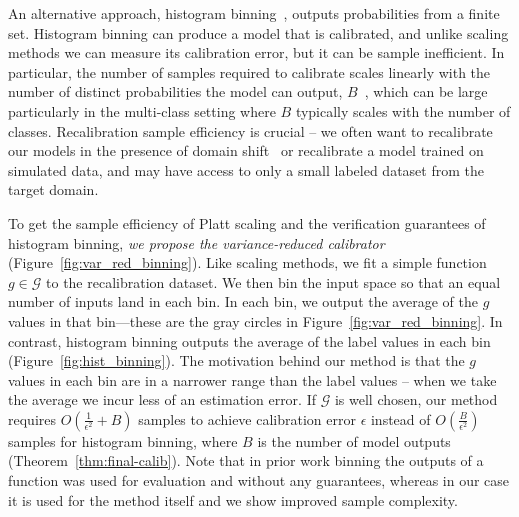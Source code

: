 An alternative approach, histogram binning~\cite{zadrozny2001calibrated}, outputs probabilities from a finite set.
Histogram binning can produce a model that is calibrated, and unlike scaling methods we can measure its calibration error, but it can be sample inefficient.
In particular, the number of samples required to calibrate scales linearly with the number of distinct probabilities the model can output, $B$~\cite{naeini2014binary}, which can be large particularly in the multi-class setting where $B$ typically scales with the number of classes.
Recalibration sample efficiency is crucial -- we often want to recalibrate our models in the presence of domain shift~\cite{hendrycks2019anomaly} or recalibrate a model trained on simulated data, and may have access to only a small labeled dataset from the target domain.

To get the sample efficiency of Platt scaling and the verification guarantees of histogram binning, \emph{we propose the variance-reduced calibrator} (Figure~\ref{fig:var_red_binning}).
Like scaling methods, we fit a simple function $g \in \mathcal{G}$ to the recalibration dataset.
We then bin the input space so that an equal number of inputs land in each bin.
In each bin, we output the average of the $g$ values in that bin---these are the gray circles in Figure~\ref{fig:var_red_binning}.
In contrast, histogram binning outputs the average of the label values in each bin (Figure~\ref{fig:hist_binning}).
The motivation behind our method is that the $g$ values in each bin are in a narrower range than the label values -- when we take the average we incur less of an estimation error.
If $\mathcal{G}$ is well chosen, our method requires $O(\frac{1}{\epsilon^2} + B)$ samples to achieve calibration error $\epsilon$ instead of $O(\frac{B}{\epsilon^2})$ samples for histogram binning, where $B$ is the number of model outputs (Theorem~\ref{thm:final-calib}). Note that in prior work binning the outputs of a function was used for evaluation and without any guarantees, whereas in our case it is used for the method itself and we show improved sample complexity.

